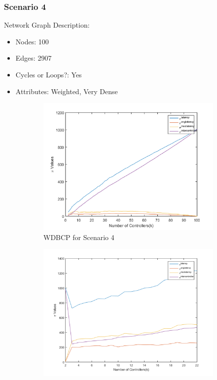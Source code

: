 \documentclass[10pt]{extarticle}
\begin{document}
	\subsubsection{Scenario 4}
	
	Network Graph Description:
	\begin{itemize}
		\item Nodes: 100
		\item Edges: 2907
		\item Cycles or Loops?: Yes
		\item Attributes: Weighted, Very Dense
	\end{itemize}
	\begin{figure}
		\begin{subfigure}{0.5\linewidth}
			\includegraphics[width=\linewidth]{wdbcp_4.png}
			\caption{WDBCP for Scenario 4}
			\label{fig:wdbcp4}
		\end{subfigure}
		\begin{subfigure}{0.5\linewidth}
			\includegraphics[width=\linewidth]{gspici_4.png}

\end{subfigure}
\end{figure}
\end{document}
